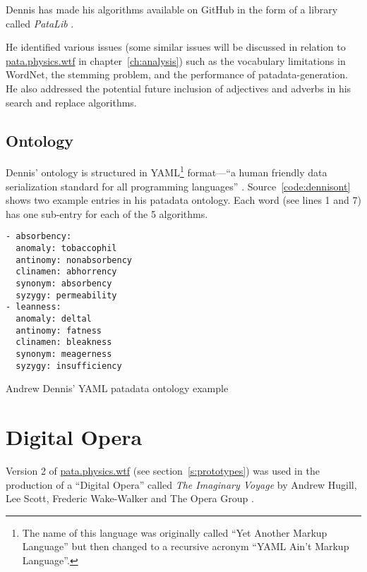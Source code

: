 Dennis has made his algorithms available on GitHub in the form of a library called \textit{PataLib} \autocite*{Dennis2016a}.

He identified various issues (some similar issues will be discussed in relation to \url{pata.physics.wtf} in chapter~\ref{ch:analysis}) such as the vocabulary limitations in WordNet, the stemming problem, and the performance of patadata-generation. He also addressed the potential future inclusion of adjectives and adverbs in his search and replace algorithms.


\subsection{Ontology}

Dennis' ontology is structured in \acs{YAML}\footnote{The name of this language was originally called ``Yet Another Markup Language'' but then changed to a recursive acronym ``YAML Ain't Markup Language''.} format---``a human friendly data serialization standard for all programming languages'' \autocite{Evans2016}. Source~\ref{code:dennisont} shows two example entries in his patadata ontology. Each word (see lines 1 and 7) has one sub-entry for each of the 5 algorithms.

\begin{listing}[!htbp] %
  \begin{verbatim}
- absorbency:
  anomaly: tobaccophil
  antinomy: nonabsorbency
  clinamen: abhorrency
  synonym: absorbency
  syzygy: permeability
- leanness:
  anomaly: deltal
  antinomy: fatness
  clinamen: bleakness
  synonym: meagerness
  syzygy: insufficiency
  \end{verbatim}
\caption[Dennis' patadata ontology example]{Andrew Dennis' \ac{YAML} patadata ontology example}
\label{code:dennisont}
\end{listing}


\section{Digital Opera}
\label{s:opera}

Version 2 of \url{pata.physics.wtf} (see section~\ref{s:prototypes}) was used in the production of a ``Digital Opera'' called \textit{The Imaginary Voyage} \autocite{Hugill2013a,Hugill2014} by Andrew Hugill, Lee Scott, Frederic Wake-Walker and The Opera Group \autocite{Mahogany2016}.

